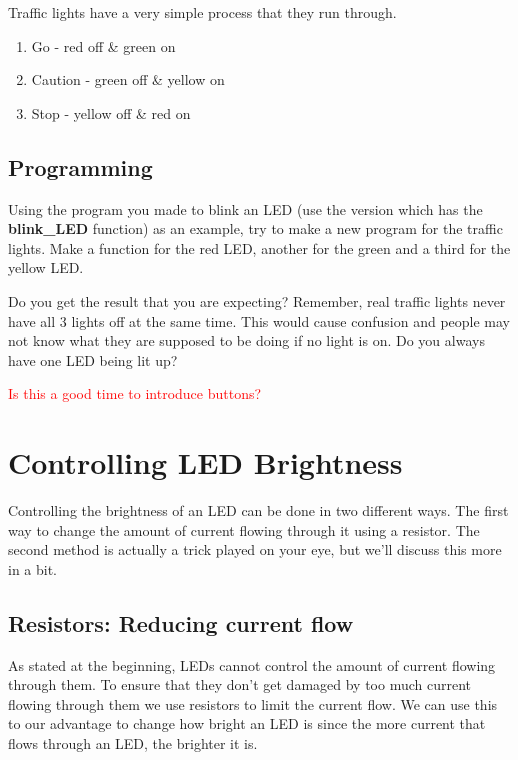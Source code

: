 \documentclass[12pt]{article}
\begin{document}
	Traffic lights have a very simple process that they run through.
	
	\begin{enumerate}
		\itemsep -1em
		\item Go - red off \& green on
		\item Caution - green off \& yellow on
		\item Stop - yellow off \& red on
	\end{enumerate}
	
	\subsection{Programming}
	
	Using the program you made to blink an LED (use the version which has the \textbf{blink\_LED} function) as an example, try to make a new program for the traffic lights. Make a function for the red LED, another for the green and a third for the yellow LED.
	
	Do you get the result that you are expecting? Remember, real traffic lights never have all 3 lights off at the same time. This would cause confusion and people may not know what they are supposed to be doing if no light is on. Do you always have one LED being lit up?
	
	
	\textcolor{red}{Is this a good time to introduce buttons?}
	
	
	\section{Controlling LED Brightness}
	
	Controlling the brightness of an LED can be done in two different ways. The first way to change the amount of current flowing through it using a resistor. The second method is actually a trick played on your eye, but we'll discuss this more in a bit.
	
	\subsection{Resistors: Reducing current flow}
	
	As stated at the beginning, LEDs cannot control the amount of current flowing through them. To ensure that they don't get damaged by too much current flowing through them we use resistors to limit the current flow. We can use this to our advantage to change how bright an LED is since the more current that flows through an LED, the brighter it is.
	
\end{document}
